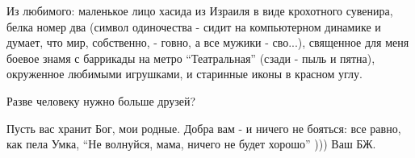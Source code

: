 Из любимого: маленькое лицо хасида из Израиля в виде крохотного сувенира, белка
номер два (символ одиночества - сидит на компьютерном динамике и думает, что
мир, собственно, - говно, а все мужики - сво...), священное для меня боевое
знамя с баррикады на метро \enquote{Театральная} (сзади - пыль и пятна), окруженное
любимыми игрушками, и старинные иконы в красном углу. 

Разве человеку нужно больше друзей? 

Пусть вас хранит Бог, мои родные. Добра вам - и ничего не бояться: все равно,
как пела Умка, \enquote{Не волнуйся, мама, ничего не будет хорошо} ))) Ваш БЖ. 

